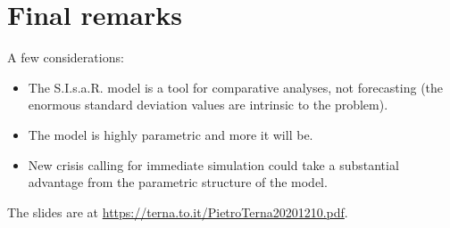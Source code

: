 \documentclass[8pt]{beamer}
\begin{document}
\section{Final remarks}

\begin{frame}{A few considerations:}

\begin{itemize}

\item The S.I.s.a.R. model is a tool for comparative analyses, not forecasting (the enormous standard deviation values are intrinsic to the problem).

\bigskip
\item The model is highly parametric and more it will be.

\bigskip
\item New crisis calling for immediate simulation could take a substantial advantage from the parametric structure of the model.

\end{itemize}

 \bigskip
 The slides are at \url{https://terna.to.it/PietroTerna20201210.pdf}.
 
\end{frame}
\end{document}
